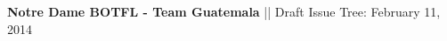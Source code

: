 \documentclass[8.5pt, landscape]{article}
\begin{document}
\begin{comment}
\bigskip
\vspace{5cm}
\centerline{\Huge \bf Autopilot Design Project}
\bigskip
\vspace{1cm}



\centerline{\Large \bf AME 40451 - Aerospace Dynamics}
\bigskip

\bigskip
\bigskip
\vspace{0cm}
\begin{center}


\noindent Matthew Kudija
\bigskip

\noindent  December 11, 2013
\bigskip

\noindent University of Notre Dame

\noindent \emph{Department of Aerospace \& Mechanical Engineering}

\end{center}

\vspace{2cm}
\newpage
\end{comment}

\begin{center}
\large {\bf{Notre Dame BOTFL - Team Guatemala}} ||   Draft Issue Tree: February 11, 2014
\end{center}
\end{document}
